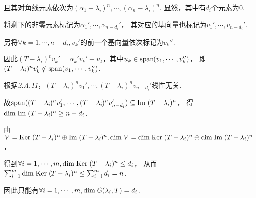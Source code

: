 且其对角线元素依次为$(\alpha_1-\lambda_i)^n,\cdots,(\alpha_n-\lambda_i)^n$.
显然，其中有$d_i$个元素为$0$.

将剩下的非零元素标记为$\alpha_1',\cdots,\alpha_{n-d_i}'$，
其对应的基向量也标记为$v_1',\cdots,v_{n-d_i}'$.

另将$\forall k=1,\cdots,n-d_i,v_k'$的前一个基向量依次标记为$v_k''$.

因此$(T-\lambda_i)^n v_k'=\alpha_k'v_k'+u_k$，其中$u_k \in \mathrm{span} (v_1,\cdots,v_k'')$，
即$(T-\lambda_i)^n v_k' \notin \mathrm{span} (v_1,\cdots,v_k'')$.

根据\textit{2.A.11}，$(T-\lambda_i)^n v_1',\cdots,(T-\lambda_i)^n v_{n-d_i}'$线性无关.

故$\mathrm{span} ((T-\lambda_i)^n v_1',\cdots,(T-\lambda_i)^n v_{n-d_i}') \subseteq \mathrm{Im \;} (T-\lambda_i)^n$，
得$\mathrm{dim \;} \mathrm{Im \;} (T-\lambda_i)^n \geq n-d_i$.

由$V=\mathrm{Ker \;} (T-\lambda_i)^n \oplus \mathrm{Im \;} (T-\lambda_i)^n,
\mathrm{dim \;} V=\mathrm{dim \;} \mathrm{Ker \;} (T-\lambda_i)^n \oplus \mathrm{dim \;} \mathrm{Im \;} (T-\lambda_i)^n$，

得到$\forall i=1,\cdots,m,\mathrm{dim \;} \mathrm{Ker \;} (T-\lambda_i)^n \leq d_i$，
从而$\sum_{i=1}^m \mathrm{dim \;} \mathrm{Ker \;} (T-\lambda_i)^n \leq \sum_{i=1}^m d_i=n$.

因此只能有$\forall i=1,\cdots,m,\mathrm{dim \;} G(\lambda_i,T)=d_i$.

